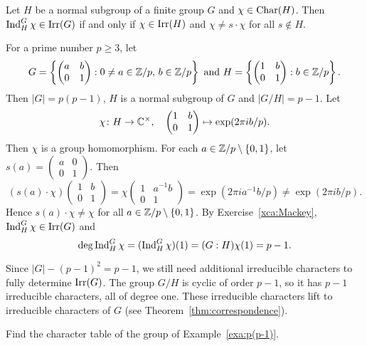 \begin{exercise}
\label{xca:Mackey}
    Let $H$ be a normal subgroup of a finite group $G$ and $\chi\in\operatorname{Char}(H)$.
    Then $\operatorname{Ind}_H^G\chi\in\operatorname{Irr}(G)$ if and only if $\chi\in\operatorname{Irr}(H)$ and $\chi\ne s\cdot\chi$ 
    for all $s\not\in H$. 
\end{exercise}

\begin{example}
\label{exa:p(p-1)}
    For a prime number $p\geq3$, let 
    \[
        G=\left\{\begin{pmatrix}a&b\\0&1\end{pmatrix}:0\ne a\in\mathbb{Z}/p,\,b\in\mathbb{Z}/p\right\}\text{ and }
        H=\left\{\begin{pmatrix}1&b\\0&1\end{pmatrix}:b\in\mathbb{Z}/p\right\}.
    \]
    Then $|G|=p(p-1)$, $H$ is a normal subgroup of $G$ and $|G/H|=p-1$. Let 
    \[
    \chi\colon H\to\mathbb{C}^{\times},\quad\begin{pmatrix}1&b\\0&1\end{pmatrix}\mapsto \exp(2\pi ib/p).
    \]
    Then $\chi$ is a group homomorphism. For each $a\in\mathbb{Z}/p\setminus\{0,1\}$, let $s(a)=\begin{pmatrix}a&0\\0&1\end{pmatrix}$. Then 
    \[
    (s(a)\cdot\chi)\begin{pmatrix}1&b\\0&1\end{pmatrix}=\chi\begin{pmatrix}1&a^{-1}b\\0&1\end{pmatrix}=\exp(2\pi ia^{-1}b/p)
    \ne \exp(2\pi ib/p).
    \]
    Hence $s(a)\cdot\chi\ne\chi$ for all $a\in\mathbb{Z}/p\setminus\{0,1\}$. By Exercise~\ref{xca:Mackey}, 
    $\operatorname{Ind}_H^G\chi\in\operatorname{Irr}(G)$ and 
    \[
    \deg\operatorname{Ind}_H^G\chi=(\operatorname{Ind}_H^G\chi)(1)=(G:H)\chi(1)=p-1.
    \]
    
    Since 
    $|G|-(p-1)^2=p-1$, 
    we still need additional irreducible characters to fully determine $\operatorname{Irr}(G)$. 
    The group $G/H$ is cyclic of order $p-1$, so it has $p-1$ irreducible characters, all of degree one. 
    These irreducible characters lift to irreducible characters of $G$ (see Theorem~\ref{thm:correspondence}). 
\end{example}

\begin{bonus}
\label{xca:p(p-1)}
    Find the character table of the group of Example~\ref{exa:p(p-1)}. 
\end{bonus}